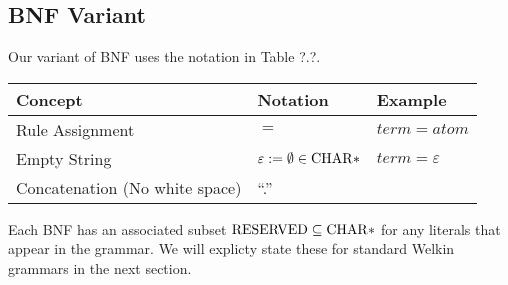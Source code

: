 \subsection{BNF Variant}
Our variant of BNF uses the notation in Table ?.?.
\begin{center}
\begin{tabular}{ | m{3cm} | m{5cm} | m{5cm} | }
	\hline
  Concept & Notation & Example \\
  \hline
	Rule Assignment & $=$ & $term = atom$\\
  Empty String & $\varepsilon := \emptyset \in \mathrm{CHAR}*$ & $term = \varepsilon$ \\
  Concatenation (No white space) & ``.'' & \\
  \hline
\end{tabular}
\end{center}
Each BNF has an associated subset $\mathrm{RESERVED} \subseteq \mathrm{CHAR}*$ for any literals that appear in the grammar. We will explicty state these for standard Welkin grammars in the next section.
